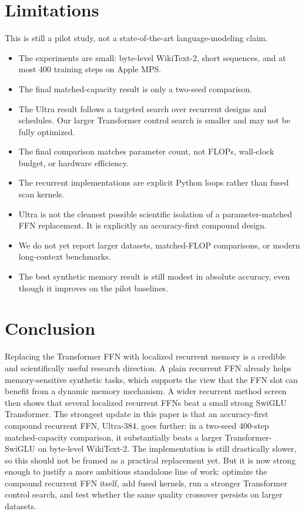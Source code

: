\documentclass[11pt]{article}
\begin{document}
\section{Limitations}
This is still a pilot study, not a state-of-the-art language-modeling claim.
\begin{itemize}[leftmargin=1.25em]
  \item The experiments are small: byte-level WikiText-2, short sequences, and
  at most 400 training steps on Apple MPS.
  \item The final matched-capacity result is only a two-seed comparison.
  \item The Ultra result follows a targeted search over recurrent designs and
  schedules. Our larger Transformer control search is smaller and may not be
  fully optimized.
  \item The final comparison matches parameter count, not FLOPs, wall-clock
  budget, or hardware efficiency.
  \item The recurrent implementations are explicit Python loops rather than
  fused scan kernels.
  \item Ultra is not the cleanest possible scientific isolation of a
  parameter-matched FFN replacement. It is explicitly an accuracy-first
  compound design.
  \item We do not yet report larger datasets, matched-FLOP comparisons, or
  modern long-context benchmarks.
  \item The best synthetic memory result is still modest in absolute accuracy,
  even though it improves on the pilot baselines.
\end{itemize}

\section{Conclusion}
Replacing the Transformer FFN with localized recurrent memory is a credible and
scientifically useful research direction. A plain recurrent FFN already helps
memory-sensitive synthetic tasks, which supports the view that the FFN slot can
benefit from a dynamic memory mechanism. A wider recurrent method screen then
shows that several localized recurrent FFNs beat a small strong SwiGLU
Transformer. The strongest update in this paper is that an accuracy-first
compound recurrent FFN, Ultra-384, goes further: in a two-seed 400-step
matched-capacity comparison, it substantially beats a larger Transformer-SwiGLU
on byte-level WikiText-2. The implementation is still drastically slower, so
this should not be framed as a practical replacement yet. But it is now strong
enough to justify a more ambitious standalone line of work: optimize the
compound recurrent FFN itself, add fused kernels, run a stronger Transformer
control search, and test whether the same quality crossover persists on larger
datasets.



\end{document}
